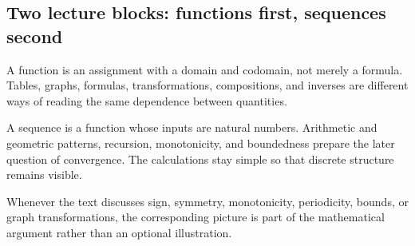 \subsection{Two lecture blocks: functions first, sequences second}

\begin{corebox}
A function is an assignment with a domain and codomain, not merely a formula. Tables, graphs, formulas, transformations, compositions, and inverses are different ways of reading the same dependence between quantities.
\end{corebox}

\begin{corebox}
A sequence is a function whose inputs are natural numbers. Arithmetic and geometric patterns, recursion, monotonicity, and boundedness prepare the later question of convergence. The calculations stay simple so that discrete structure remains visible.
\end{corebox}

Whenever the text discusses sign, symmetry, monotonicity, periodicity, bounds, or graph transformations, the corresponding picture is part of the mathematical argument rather than an optional illustration.
